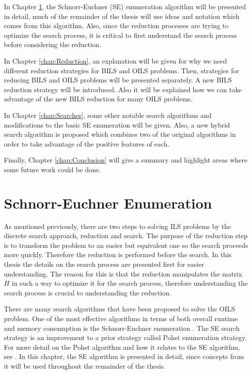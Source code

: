 \documentclass[12pt,Bold,letterpaper]{mcgilletdclass}
\begin{document}
In Chapter \ref{chap:SESearch}, the Schnorr-Euchner (SE) enumeration algorithm \cite{SchE94} will be presented in detail, much of the remainder of the thesis will use ideas and notation which comes from this algorithm. Also, since the reduction processes are trying to optimize the search process, it is critical to first understand the search process before considering the reduction.

In Chapter \ref{chap:Reduction}, an explanation will be given for why we need different reduction strategies for BILS and OILS problems. Then, strategies for reducing BILS and OILS problems will be presented separately. A new BILS reduction strategy will be introduced. Also it will be explained how we can take advantage of the new BILS reduction for many OILS problems.

In Chapter \ref{chap:Searches}, some other notable search algorithms and modifications to the basic SE enumeration will be given. Also, a new hybrid search algorithm is proposed which combines two of the original algorithms in order to take advantage of the positive features of each.

Finally, Chapter \ref{chap:Conclusion} will give a summary and highlight areas where some future work could be done.

\chapter{Schnorr-Euchner Enumeration} \label{chap:SESearch}

As mentioned previously, there are two steps to solving ILS problems by the discrete search approach, reduction and search. The purpose of the reduction step is to transform the problem to an easier but equivalent one so the search proceeds more quickly. Therefore the reduction is performed before the search. In this thesis the details on the search process are presented first for easier understanding. The reason for this is that the reduction manipulates the matrix $H$ in such a way to optimize it for the search process, therefore understanding the search process is crucial to understanding the reduction.

There are many search algorithms that have been proposed to solve the OILS problem. One of the most effective algorithms in terms of both overall runtime and memory consumption is the Schnorr-Euchner enumeration \cite{SchE94}. The SE search strategy is an improvement to a prior strategy called Pohst enumeration strategy. For more detail on the Pohst algorithm and how it relates to the SE algorithm, see \cite{AgrEVZ02}. In this chapter, the SE algorithm is presented in detail, since concepts from it will be used throughout the remainder of the thesis.
\end{document}
